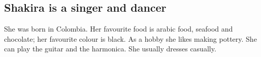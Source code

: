 \subsection*{Shakira is a singer and dancer}

She was born in Colombia. Her favourite food is arabic food, seafood and chocolate; her favourite colour is black. As a hobby she likes making pottery. She can play the guitar and the harmonica. She usually dresses casually.



